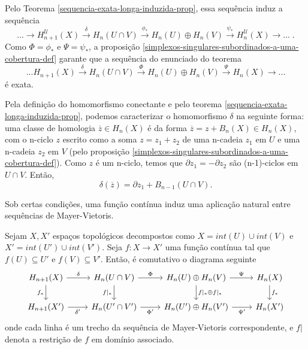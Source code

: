 \begin{dem}
    Pelo Teorema \ref{sequencia-exata-longa-induzida-prop}, essa sequência induz a sequência 
    \[...\rightarrow H_{n+1}^\mathcal{U}(X)\xrightarrow{\delta} H_n(U\cap V)\xrightarrow{\phi_*}H_n(U)\oplus H_n(V)\xrightarrow{\psi_*} H^\mathcal{U}_n(X)\rightarrow ...\;.\]
    Como $\Phi=\phi_*$ e $\Psi=\psi_*$, a proposição \ref{simplexos-singulares-subordinados-a-uma-cobertura-def} garante que a sequência do enunciado do teorema 
    \[...H_{n+1}(X)\xrightarrow{\delta} H_n(U\cap V)\xrightarrow{\Phi}H_n(U)\oplus H_n(V)\xrightarrow{\Psi} H_n(X)\rightarrow ...\]
    é exata.
\end{dem}
Pela definição do homomorfismo conectante e pelo teorema \ref{sequencia-exata-longa-induzida-prop}, podemos caracterizar o homomorfismo $\delta$ na seguinte forma: uma classe de homologia $\overline{z}\in H_n (X)$ é da forma $\overline{z}=z+B_n(X)\in H_n(X)$, com o n-ciclo $z$ escrito como a soma $z=z_1+z_2$ de uma n-cadeia $z_1$ em $U$ e uma n-cadeia $z_2$ em $V$ (pelo proposição \ref{simplexos-singulares-subordinados-a-uma-cobertura-def}). Como $z$ é um n-ciclo, temos que $\partial z_1=-\partial z_2$ são (n-1)-ciclos em $U\cap V$. Então, 
\[\delta(\overline{z})=\partial z_1+B_{n-1}(U\cap V).\]

Sob certas condições, uma função contínua induz uma aplicação natural entre sequências de Mayer-Vietoris.

\begin{prop}
    Sejam $X, X'$ espaços topológicos decompostos como $X=int(U)\cup int(V)$ e $X'=int(U')\cup int(V')$. Seja $f:X\rightarrow X'$ uma função contínua tal que $f(U)\subseteq U'$ e $f(V)\subseteq V'$. Então, é comutativo o diagrama seguinte
\[\begin{tikzcd}
	{H_{n+1}(X)} & {H_n(U\cap V)} & {H_n(U)\oplus H_n(V)} & {H_n(X)} \\
	{H_{n+1}(X')} & {H_n(U'\cap V')} & {H_n(U')\oplus H_n(V')} & {H_n(X')}
	\arrow["\delta", from=1-1, to=1-2]
	\arrow["{f_*}"', from=1-1, to=2-1]
	\arrow["\Phi", from=1-2, to=1-3]
	\arrow["{f|_*}"', from=1-2, to=2-2]
	\arrow["\Psi", from=1-3, to=1-4]
	\arrow["{f|_*\oplus f|_*}", from=1-3, to=2-3]
	\arrow["{f_*}", from=1-4, to=2-4]
	\arrow["{\delta'}"', from=2-1, to=2-2]
	\arrow["{\Phi'}"', from=2-2, to=2-3]
	\arrow["{\Psi'}"', from=2-3, to=2-4]
\end{tikzcd}\]
    onde cada linha é um trecho da sequência de Mayer-Vietoris correspondente, e $f|$ denota a restrição de $f$ em domínio associado.
\end{prop}

